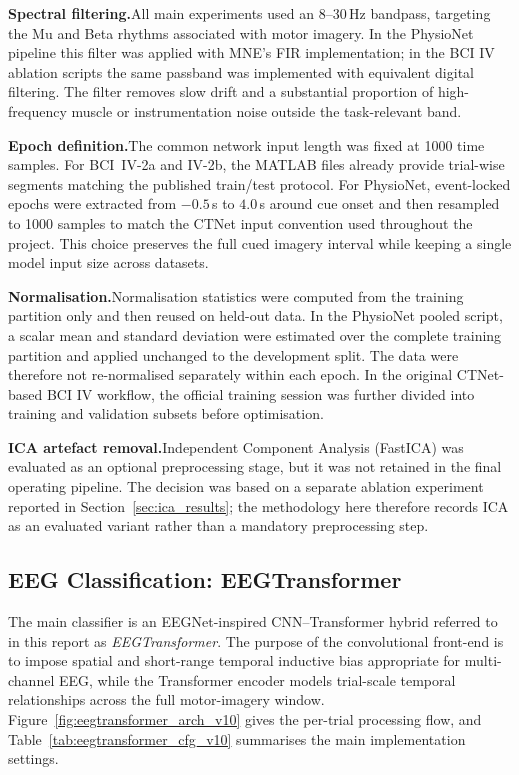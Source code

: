 \documentclass[12pt, a4paper]{article}
\begin{document}
\textbf{Spectral filtering.}\quad All main experiments used an 8--30\,Hz bandpass, targeting the Mu and Beta rhythms associated with motor imagery. In the PhysioNet pipeline this filter was applied with MNE's FIR implementation; in the BCI IV ablation scripts the same passband was implemented with equivalent digital filtering. The filter removes slow drift and a substantial proportion of high-frequency muscle or instrumentation noise outside the task-relevant band.

\textbf{Epoch definition.}\quad The common network input length was fixed at 1000 time samples. For BCI~IV-2a and IV-2b, the MATLAB files already provide trial-wise segments matching the published train/test protocol. For PhysioNet, event-locked epochs were extracted from $-0.5$\,s to $4.0$\,s around cue onset and then resampled to 1000 samples to match the CTNet input convention used throughout the project. This choice preserves the full cued imagery interval while keeping a single model input size across datasets.

\textbf{Normalisation.}\quad Normalisation statistics were computed from the training partition only and then reused on held-out data. In the PhysioNet pooled script, a scalar mean and standard deviation were estimated over the complete training partition and applied unchanged to the development split. The data were therefore not re-normalised separately within each epoch. In the original CTNet-based BCI IV workflow, the official training session was further divided into training and validation subsets before optimisation.

\textbf{ICA artefact removal.}\quad Independent Component Analysis (FastICA) was evaluated as an optional preprocessing stage, but it was not retained in the final operating pipeline. The decision was based on a separate ablation experiment reported in Section~\ref{sec:ica_results}; the methodology here therefore records ICA as an evaluated variant rather than a mandatory preprocessing step.

\subsection{EEG Classification: EEGTransformer}

The main classifier is an EEGNet-inspired CNN--Transformer hybrid referred to in this report as \textit{EEGTransformer}. The purpose of the convolutional front-end is to impose spatial and short-range temporal inductive bias appropriate for multi-channel EEG, while the Transformer encoder models trial-scale temporal relationships across the full motor-imagery window. Figure~\ref{fig:eegtransformer_arch_v10} gives the per-trial processing flow, and Table~\ref{tab:eegtransformer_cfg_v10} summarises the main implementation settings.
\end{document}
